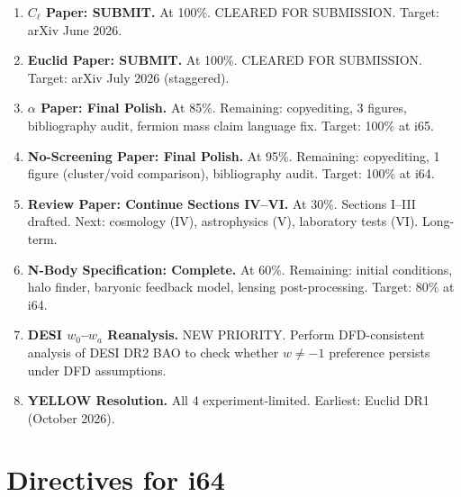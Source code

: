 \documentclass[11pt,a4paper]{article}
\begin{document}
\begin{enumerate}[label=\textbf{P\arabic*.}]
\item \textbf{$C_\ell$ Paper: SUBMIT.} At 100\%. CLEARED FOR SUBMISSION. Target: arXiv June 2026.

\item \textbf{Euclid Paper: SUBMIT.} At 100\%. CLEARED FOR SUBMISSION. Target: arXiv July 2026 (staggered).

\item \textbf{$\alpha$ Paper: Final Polish.} At 85\%. Remaining: copyediting, 3 figures, bibliography audit, fermion mass claim language fix. Target: 100\% at i65.

\item \textbf{No-Screening Paper: Final Polish.} At 95\%. Remaining: copyediting, 1 figure (cluster/void comparison), bibliography audit. Target: 100\% at i64.

\item \textbf{Review Paper: Continue Sections IV--VI.} At 30\%. Sections I--III drafted. Next: cosmology (IV), astrophysics (V), laboratory tests (VI). Long-term.

\item \textbf{N-Body Specification: Complete.} At 60\%. Remaining: initial conditions, halo finder, baryonic feedback model, lensing post-processing. Target: 80\% at i64.

\item \textbf{DESI $w_0$--$w_a$ Reanalysis.} NEW PRIORITY. Perform DFD-consistent analysis of DESI DR2 BAO to check whether $w \neq -1$ preference persists under DFD assumptions.

\item \textbf{YELLOW Resolution.} All 4 experiment-limited. Earliest: Euclid DR1 (October 2026).
\end{enumerate}


\section{Directives for i64}
\label{sec:directives}
\end{document}
